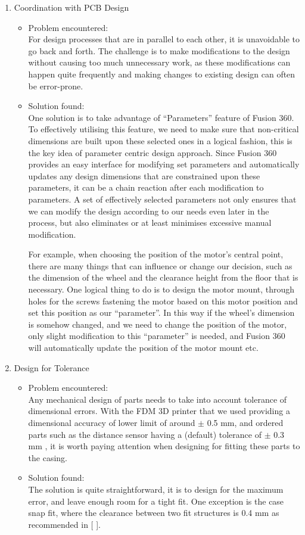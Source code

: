 \begin{enumerate}
  \item Coordination with PCB Design
  \begin{itemize}
      \item Problem encountered:\\
      For design processes that are in parallel to each other, it is unavoidable to go back and forth. The challenge is to make modifications to the design without causing too much unnecessary work, as these modifications can happen quite frequently and making changes to existing design can often be error-prone.
      \item Solution found:\\
      One solution is to take advantage of “Parameters” feature of Fusion 360. To effectively utilising this feature, we need to make sure that non-critical dimensions are built upon these selected ones in a logical fashion, this is the key idea of parameter centric design approach. Since Fusion 360 provides an easy interface for modifying set parameters and automatically updates any design dimensions that are constrained upon these parameters, it can be a chain reaction after each modification to parameters. A set of effectively selected parameters not only ensures that we can modify the design according to our needs even later in the process, but also eliminates or at least minimises excessive manual modification.
      
      For example, when choosing the position of the motor’s central point, there are many things that can influence or change our decision, such as the dimension of the wheel and the clearance height from the floor that is necessary. One logical thing to do is to design the motor mount, through holes for the screws fastening the motor based on this motor position and set this position as our “parameter”. In this way if the wheel’s dimension is somehow changed, and we need to change the position of the motor, only slight modification to this “parameter” is needed, and Fusion 360 will automatically update the position of the motor mount etc.
  \end{itemize}
  \item Design for Tolerance
  \begin{itemize}
      \item Problem encountered:\\
      Any mechanical design of parts needs to take into account tolerance of dimensional errors. With the FDM 3D printer that we used providing a dimensional accuracy of lower limit of around $\pm$ 0.5 mm, and ordered parts such as the distance sensor having a (default) tolerance of $\pm$ 0.3 mm \cite{sens}, it is worth paying attention when designing for fitting these parts to the casing.
      \item Solution found:\\
      The solution is quite straightforward, it is to design for the maximum error, and leave enough room for a tight fit. One exception is the case snap fit, where the clearance between two fit structures is 0.4 mm as recommended in [  ].
      

\end{itemize}
\end{enumerate}
